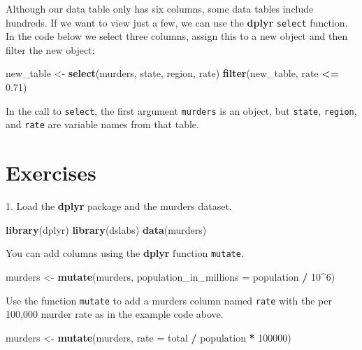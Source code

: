 \documentclass[
]{krantz}
\newenvironment{Shaded}{\begin{snugshade}}{\end{snugshade}}
\newcommand{\DataTypeTok}[1]{\textcolor[rgb]{0.27,0.27,0.27}{#1}}
\newcommand{\DecValTok}[1]{\textcolor[rgb]{0.06,0.06,0.06}{#1}}
\newcommand{\FloatTok}[1]{\textcolor[rgb]{0.06,0.06,0.06}{#1}}
\newcommand{\KeywordTok}[1]{\textcolor[rgb]{0.27,0.27,0.27}{\textbf{#1}}}
\newcommand{\NormalTok}[1]{#1}
\newcommand{\OperatorTok}[1]{\textcolor[rgb]{0.43,0.43,0.43}{\textbf{#1}}}
\newcommand{\StringTok}[1]{\textcolor[rgb]{0.5,0.5,0.5}{#1}}
\begin{document}
Although our data table only has six columns, some data tables include hundreds. If we want to view just a few, we can use the \textbf{dplyr} \texttt{select} function. In the code below we select three columns, assign this to a new object and then filter the new object:

\begin{Shaded}
\begin{Highlighting}[]
\NormalTok{new_table <-}\StringTok{ }\KeywordTok{select}\NormalTok{(murders, state, region, rate)}
\KeywordTok{filter}\NormalTok{(new_table, rate }\OperatorTok{<=}\StringTok{ }\FloatTok{0.71}\NormalTok{)}
\end{Highlighting}
\end{Shaded}

In the call to \texttt{select}, the first argument \texttt{murders} is an object, but \texttt{state}, \texttt{region}, and \texttt{rate} are variable names from that table.

\hypertarget{exercises-9}{%
\section{Exercises}\label{exercises-9}}

1. Load the \textbf{dplyr} package and the murders dataset.

\begin{Shaded}
\begin{Highlighting}[]
\KeywordTok{library}\NormalTok{(dplyr)}
\KeywordTok{library}\NormalTok{(dslabs)}
\KeywordTok{data}\NormalTok{(murders)}
\end{Highlighting}
\end{Shaded}

You can add columns using the \textbf{dplyr} function \texttt{mutate}.

\begin{Shaded}
\begin{Highlighting}[]
\NormalTok{murders <-}\StringTok{ }\KeywordTok{mutate}\NormalTok{(murders, }\DataTypeTok{population_in_millions =}\NormalTok{ population }\OperatorTok{/}\StringTok{ }\DecValTok{10}\OperatorTok{^}\DecValTok{6}\NormalTok{)}
\end{Highlighting}
\end{Shaded}

Use the function \texttt{mutate} to add a murders column named \texttt{rate} with the per 100,000 murder rate as in the example code above.

\begin{Shaded}
\begin{Highlighting}[]
\NormalTok{murders <-}\StringTok{ }\KeywordTok{mutate}\NormalTok{(murders, }\DataTypeTok{rate =}\NormalTok{ total }\OperatorTok{/}\StringTok{ }\NormalTok{population }\OperatorTok{*}\StringTok{ }\DecValTok{100000}\NormalTok{)}
\end{Highlighting}
\end{Shaded}
\end{document}
